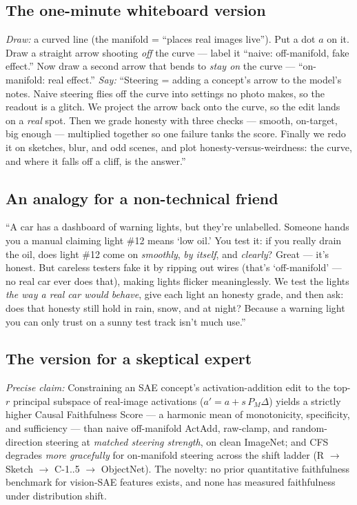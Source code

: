 \documentclass[12pt]{article}
\newcommand{\onm}[1]{\textcolor{onman}{#1}}
\newcommand{\offm}[1]{\textcolor{offman}{#1}}
\begin{document}
\subsection*{The one-minute whiteboard version}
\emph{Draw:} a curved line (the manifold = ``places real images live''). Put a dot $a$ on it. Draw a straight arrow shooting \emph{off} the curve --- label it ``\offm{naive: off-manifold, fake effect}.'' Now draw a second arrow that bends to \emph{stay on} the curve --- ``\onm{on-manifold: real effect}.''
\emph{Say:} ``Steering = adding a concept's arrow to the model's notes. Naive steering flies off the curve into settings no photo makes, so the readout is a glitch. We project the arrow back onto the curve, so the edit lands on a \emph{real} spot. Then we grade honesty with three checks --- smooth, on-target, big enough --- multiplied together so one failure tanks the score. Finally we redo it on sketches, blur, and odd scenes, and plot honesty-versus-weirdness: the curve, and where it falls off a cliff, is the answer.''

\subsection*{An analogy for a non-technical friend}
``A car has a dashboard of warning lights, but they're unlabelled. Someone hands you a manual claiming light \#12 means `low oil.' You test it: if you really drain the oil, does light \#12 come on \emph{smoothly}, \emph{by itself}, and \emph{clearly}? Great --- it's honest. But careless testers fake it by ripping out wires (that's `off-manifold' --- no real car ever does that), making lights flicker meaninglessly. We test the lights \emph{the way a real car would behave}, give each light an honesty grade, and then ask: does that honesty still hold in rain, snow, and at night? Because a warning light you can only trust on a sunny test track isn't much use.''

\subsection*{The version for a skeptical expert}
\emph{Precise claim:} Constraining an SAE concept's activation-addition edit to the top-$r$ principal subspace of real-image activations ($a' = a + s\,P_M\Delta$) yields a strictly higher Causal Faithfulness Score --- a harmonic mean of monotonicity, specificity, and sufficiency --- than naive off-manifold ActAdd, raw-clamp, and random-direction steering at \emph{matched steering strength}, on clean ImageNet; and CFS degrades \emph{more gracefully} for on-manifold steering across the shift ladder (R $\to$ Sketch $\to$ C-1..5 $\to$ ObjectNet). The novelty: no prior quantitative faithfulness benchmark for vision-SAE features exists, and none has measured faithfulness under distribution shift.
\end{document}
